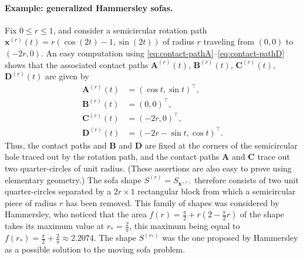 \documentclass[11pt]{article}
\begin{document}
\paragraph{Example: generalized Hammersley sofas.}  Fix $0\le r\le 1$, and consider a semicircular rotation path $\mathbf{x}^{(r)}(t) = r(\cos(2t)-1,\sin(2t))$ of radius $r$ traveling from $(0,0)$ to $(-2r,0)$. An easy computation using \eqref{eq:contact-pathA}--\eqref{eq:contact-pathD} shows that the associated contact paths 
$\mathbf{A}^{(r)}(t)$, $\mathbf{B}^{(r)}(t)$, $\mathbf{C}^{(r)}(t)$, $\mathbf{D}^{(r)}(t)$ are given by
\begin{align*} 
\mathbf{A}^{(r)}(t) & =(\cos t, \sin t)^\top, \\
\mathbf{B}^{(r)}(t) & =(0,0)^\top, \\
\mathbf{C}^{(r)}(t) & =(-2r, 0)^\top, \\
\mathbf{D}^{(r)}(t) & =(-2r - \sin t, \cos t)^\top.
\end{align*}
Thus, the contact paths and $\mathbf{B}$ and $\mathbf{D}$ are fixed at the corners of the semicircular hole traced out by the rotation path, and the contact paths $\mathbf{A}$ and $\mathbf{C}$ trace out two quarter-circles of unit radius. (These assertions are also easy to prove using elementary geometry.) The sofa shape $S^{(r)}=S_{\mathbf{x}^{(r)}}$ therefore consists of two unit quarter-circles separated by a $2r\times 1$ rectangular block from which a semicircular piece of radius $r$ has been removed. 
This family of shapes was considered by Hammersley, who noticed that the area $f(r) = \frac{\pi}{2}+r\left(2-\frac{\pi}{2}r\right)$ of the shape takes its maximum value at $r_* = \frac{2}{\pi}$, this maximum being equal to $f(r_*) = \frac{\pi}{2}+\frac{2}{\pi}\approx2.2074$. The shape $S^{(r_*)}$ was the one proposed by Hammersley as a possible solution to the moving sofa problem.
\end{document}
